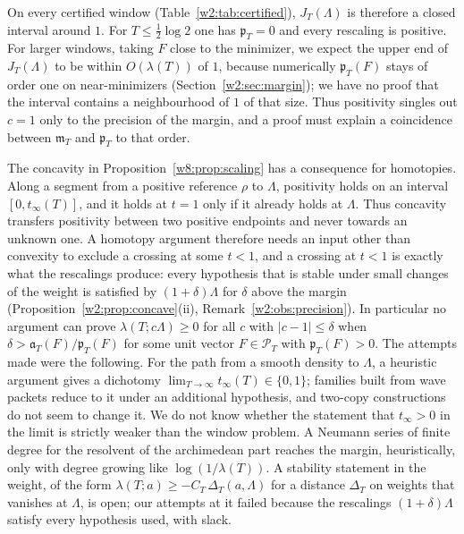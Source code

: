 \documentclass[11pt]{amsart}
\theoremstyle{definition}
\theoremstyle{remark}
\numberwithin{equation}{section}
\newcommand{\PT}{\mathcal{P}_T}                        %
\newcommand{\mT}{\mathfrak{m}_T}                       %
\newcommand{\pT}{\mathfrak{p}_T}                       %
\newcommand{\aT}{\mathfrak{a}_T}                       %
\newcommand{\lam}{\lambda(T)}                          %
\begin{document}
On every certified window (Table~\ref{w2:tab:certified}), $J_T(\Lambda)$ is therefore a closed interval around
$1$. For $T\le\frac12\log2$ one has $\pT=0$ and every rescaling is positive. For larger windows, taking $F$ close
to the minimizer, we expect the upper end of $J_T(\Lambda)$ to be within $O(\lam)$ of $1$, because numerically
$\pT(F)$ stays of order one on near-minimizers (Section~\ref{w2:sec:margin}); we have no proof that the interval
contains a neighbourhood of $1$ of that size. Thus positivity singles out $c=1$ only to the precision of the
margin, and a proof must explain a coincidence between $\mT$ and $\pT$ to that order.

The concavity in Proposition~\ref{w8:prop:scaling} has a consequence for homotopies. Along a segment from a
positive reference $\rho$ to $\Lambda$, positivity holds on an interval $[0,t_\infty(T)]$, and it holds at $t=1$
only if it already holds at $\Lambda$. Thus concavity transfers positivity between two positive endpoints and
never towards an unknown one. A homotopy argument therefore needs an input other than convexity to exclude a
crossing at some $t<1$, and a crossing at $t<1$ is exactly what the rescalings produce: every hypothesis that is
stable under small changes of the weight is satisfied by $(1+\delta)\Lambda$ for $\delta$ above the margin
(Proposition~\ref{w2:prop:concave}(ii), Remark~\ref{w2:obs:precision}). In particular no argument can
prove $\lambda(T;c\Lambda)\ge0$ for all $c$ with $|c-1|\le\delta$ when $\delta>\aT(F)/\pT(F)$ for some unit
vector $F\in\PT$ with $\pT(F)>0$. The attempts made were the following. For the path from a smooth density to
$\Lambda$, a heuristic argument gives a dichotomy $\lim_{T\to\infty}t_\infty(T)\in\{0,1\}$; families built from
wave packets reduce to it under an additional hypothesis, and two-copy constructions do not seem to change it. We
do not know whether the statement that $t_\infty>0$ in the limit is strictly weaker than the window problem. A
Neumann series of finite degree for the resolvent of the archimedean part reaches the margin, heuristically, only
with degree growing like $\log(1/\lam)$. A stability statement in the weight, of the form
$\lambda(T;a)\ge-C_T\,\Delta_T(a,\Lambda)$ for a distance $\Delta_T$ on weights that vanishes at $\Lambda$, is
open; our attempts at it failed because the rescalings $(1+\delta)\Lambda$ satisfy every hypothesis used, with
slack.
\end{document}
